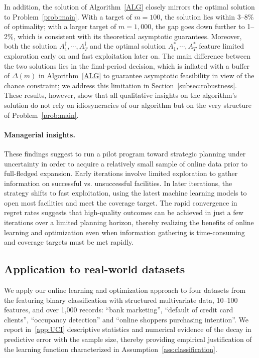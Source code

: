 \documentclass[blindrev]{informs3noheader}
\begin{document}
In addition, the solution of Algorithm~\ref{ALG} closely mirrors the optimal solution to Problem~\eqref{prob:main}. With a target of $m=100$, the solution lies within 3--8\% of optimality; with a larger target of $m=1,000$, the gap goes down further to 1--2\%, which is consistent with its theoretical asymptotic guarantees. Moreover, both the solution $A^\dagger_1,\cdots,A^\dagger_T$ and the optimal solution $A^*_1,\cdots,A^*_T$ feature limited exploration early on and fast exploitation later on. The main difference between the two solutions lies in the final-period decision, which is inflated with a buffer of $\Delta(m)$ in Algorithm~\ref{ALG} to guarantee asymptotic feasibility in view of the chance constraint; we address this limitation in Section~\ref{subsec:robustness}. These results, however, show that all qualitative insights on the algorithm's solution do not rely on idiosyncracies of our algorithm but on the very structure of Problem~\eqref{prob:main}.

\paragraph{Managerial insights.}
These findings suggest to run a pilot program toward strategic planning under uncertainty in order to acquire a relatively small sample of online data prior to full-fledged expansion. Early iterations involve limited exploration to gather information on successful vs. unsuccessful facilities. In later iterations, the strategy shifts to fast exploitation, using the latest machine learning models to open most facilities and meet the coverage target. The rapid convergence in regret rates suggests that high-quality outcomes can be achieved in just a few iterations over a limited planning horizon, thereby realizing the benefits of online learning and optimization even when information gathering is time-consuming and coverage targets must be met rapidly.

\subsection{Application to real-world datasets}
\label{subsec:UCI}

We apply our online learning and optimization approach to four datasets from the \cite{UCI} featuring binary classification with structured multivariate data, 10--100 features, and over 1,000 records: ``bank marketing'', ``default of credit card clients'', ``occupancy detection'' and ``online shoppers purchasing intention''. We report in~\ref{app:UCI} descriptive statistics and numerical evidence of the decay in predictive error with the sample size, thereby providing empirical justification of the learning function characterized in Assumption~\ref{ass:classification}.
\end{document}
